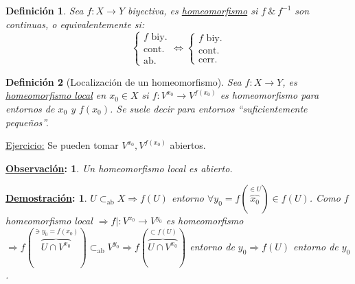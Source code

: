 \documentclass[10pt,a4paper,openright]{book}
\theoremstyle{break}
\newtheorem*{defi}{Definición}
\newtheorem*{demo}{\underline{Demostración}:}
\newtheorem*{obs}{\underline{Observación}:}
\begin{document}
\begin{defi}
    Sea $f: X \rightarrow Y$ biyectiva, es \underline{homeomorfismo} si $f\ \&\ f^{-1}$ son continuas, o equivalentemente si:
    \[
    \begin{cases}
        f \text{ biy.}\\
        \text{cont.}\\
        \text{ab.} 
    \end{cases} \Leftrightarrow \begin{cases}
        f \text{ biy.}\\
        \text{cont.}\\
        \text{cerr.}
    \end{cases} 
    \]
\end{defi}

\begin{defi}[Localización de un homeomorfismo]
Sea $f: X \rightarrow Y$, es \underline{homeomorfismo local} en $x_0 \in X$ si $f: V^{x_0} \rightarrow V^{f\left( x_0 \right)}$ es homeomorfismo para entornos de $x_0$ y $f\left( x_0 \right)$. Se suele decir para entornos ``suficientemente pequeños''.
\end{defi}

\underline{Ejercicio:} Se pueden tomar $V^{x_0}, V^{f\left( x_0 \right)}$ abiertos.

\begin{obs}
Un homeomorfismo local es abierto.
\end{obs}
\begin{demo}
    $U \subset_{\text{ab}} X \Rightarrow f\left( U \right)$ entorno $\forall y_0 = f\left(\overbrace{x_0}^{\in U}\right) \in f\left( U \right)$.
    Como $f$ homeomorfismo local $\Rightarrow f| : V^{x_0} \rightarrow V^{y_0}$ es homeomorfismo $\Rightarrow f\left( \overbrace{U \cap V^{x_0}}^{\ni y_0 = f\left( x_0 \right)} \right) \subset_{\text{ab}} V^{y_0} \Rightarrow f\left( \overbrace{U \cap V^{x_0}}^{\subset f\left( U \right)} \right)$ entorno de $y_0 \Rightarrow f\left( U \right)$ entorno de $y_0$.
\end{demo}
\end{document}
